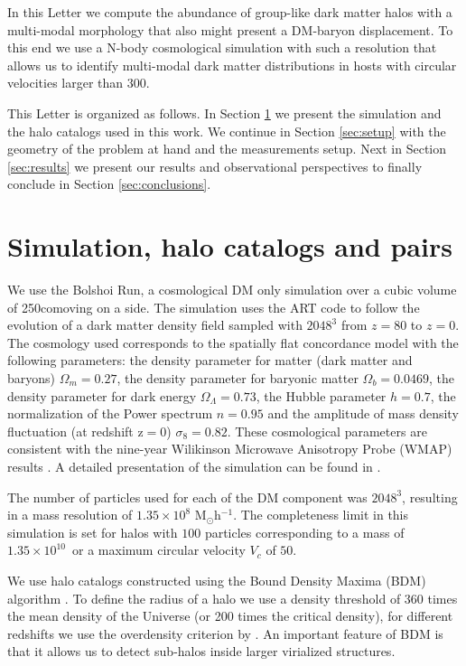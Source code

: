 \documentclass{emulateapj}
\newcommand{\hMpc}{{\ifmmode{h^{-1}{\rm Mpc}}\else{$h^{-1}$Mpc }\fi}}
\newcommand{\hMsun}{{\ifmmode{h^{-1}{\rm {M_{\odot}}}}\else{$h^{-1}{\rm{M_{\odot}}}$}\fi}}
\newcommand{\kms}{{\ifmmode{{\mathrm{\,km\ s}^{-1}}}\else{\,km~s$^{-1}$}\fi}}
\begin{document}
In this Letter we compute the abundance of group-like dark
matter halos with a multi-modal morphology that also might present a
DM-baryon displacement. To this end we use a N-body cosmological
simulation with such a resolution that allows us to identify
multi-modal dark matter distributions in hosts with circular velocities
larger than $300$\kms.  

This Letter is organized as follows. In Section
\ref{sec:simulation} we present the simulation and the halo catalogs
used in this work. We continue in Section \ref{sec:setup} with the
geometry of the problem at hand and the measurements setup. Next in
Section \ref{sec:results} we present our results and observational
perspectives to finally conclude in Section \ref{sec:conclusions}. 


\section{Simulation, halo catalogs and pairs}
\label{sec:simulation}

We use the Bolshoi Run, a cosmological DM only simulation over a cubic
volume of 250\hMpc comoving on a side. The simulation uses the ART
code \citep{Kravtsov1997} to follow the evolution of a dark matter
density field sampled with $2048^3$ from $z=80$ to $z=0$. The
cosmology used  corresponds to  the spatially flat concordance model
with the following parameters:  the density parameter for matter (dark
matter and baryons) $\Omega_m=0.27$, the density parameter for baryonic matter
$\Omega_b=0.0469$, the density parameter for dark energy
$\Omega_{\Lambda}=0.73$, the Hubble parameter $h=0.7$, the
normalization of the Power spectrum $n=0.95$ and the amplitude of mass
density fluctuation (at redshift z$=$0) $\sigma_8=0.82$.  These
cosmological parameters are consistent with the nine-year Wilikinson
Microwave Anisotropy Probe (WMAP) results \citep{hinshaw_etal13}. A
detailed presentation of the simulation can be found in
\citet{2011ApJ...740..102K}.     


The number of particles used for each of the DM component was
$2048^3$, resulting in a mass resolution of $1.35 \times 10^8$
M$_{\odot}$h$^{-1}$. The completeness limit in this simulation is set
for halos with $100$ particles corresponding to a mass of
$1.35\times10^{10}$\hMsun\ or a maximum circular velocity $V_{c}$ of
$50$\kms. 

We use halo catalogs constructed using the Bound Density Maxima (BDM)
algorithm \citep{BDM,BDMb}. To define the radius of a halo we use a
density threshold of 360 times the mean density of the Universe (or
200 times the critical density), for different redshifts we use the
overdensity criterion by \cite{Bryan1998}. An important feature of BDM
is that it allows us to detect sub-halos inside larger virialized
structures.  
\end{document}
